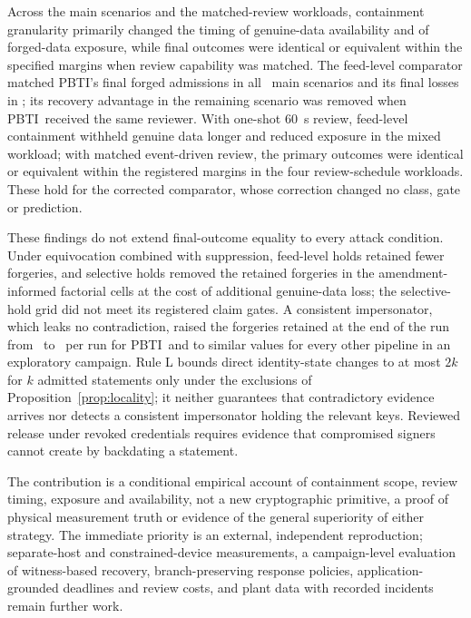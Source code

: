 \documentclass[futureinternet,article,submit,moreauthors]{Definitions/mdpi}
\newcommand{\sys}{PBTI}
\begin{document}
Across the main scenarios and the matched-review workloads, containment granularity primarily changed the timing of genuine-data availability and of forged-data exposure, while final outcomes were identical or equivalent within the specified margins when review capability was matched. The feed-level comparator matched \sys's final forged admissions in all \VPOneIdentical\ main scenarios and its final losses in \VOTwoBFiveIdentical; its recovery advantage in the remaining scenario was removed when \sys\ received the same reviewer. With one-shot 60~s review, feed-level containment withheld genuine data longer and reduced exposure in the mixed workload; with matched event-driven review, the primary outcomes were identical or equivalent within the registered margins in the four review-schedule workloads. These hold for the corrected comparator, whose correction changed no class, gate or prediction.

These findings do not extend final-outcome equality to every attack condition. Under equivocation combined with suppression, feed-level holds retained fewer forgeries, and selective holds removed the retained forgeries in the amendment-informed factorial cells at the cost of additional genuine-data loss; the selective-hold grid did not meet its registered claim gates. A consistent impersonator, which leaks no contradiction, raised the forgeries retained at the end of the run from \YEfourRegPBTIOOne\ to \YEfourConPBTIOOne\ per run for \sys\ and to similar values for every other pipeline in an exploratory campaign. Rule L bounds direct identity-state changes to at most $2k$ for $k$ admitted statements only under the exclusions of Proposition~\ref{prop:locality}; it neither guarantees that contradictory evidence arrives nor detects a consistent impersonator holding the relevant keys. Reviewed release under revoked credentials requires evidence that compromised signers cannot create by backdating a statement.

The contribution is a conditional empirical account of containment scope, review timing, exposure and availability, not a new cryptographic primitive, a proof of physical measurement truth or evidence of the general superiority of either strategy. The immediate priority is an external, independent reproduction; separate-host and constrained-device measurements, a campaign-level evaluation of witness-based recovery, branch-preserving response policies, application-grounded deadlines and review costs, and plant data with recorded incidents remain further work.
\end{document}
